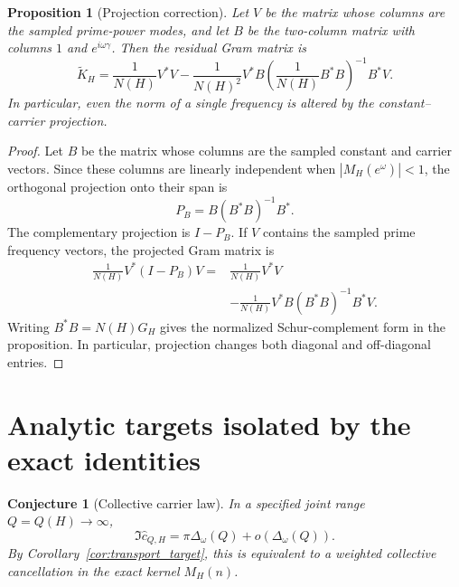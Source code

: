 \documentclass[11pt]{amsart}
\numberwithin{equation}{section}
\theoremstyle{plain}
\newtheorem{proposition}[theorem]{Proposition}
\newtheorem{conjecture}[theorem]{Conjecture}
\theoremstyle{definition}
\theoremstyle{remark}
\newcommand{\1}{\mathbf{1}}
\begin{document}
\begin{proposition}[Projection correction]
\label{prop:projection_correction_detailed}
Let $V$ be the matrix whose columns are the sampled prime-power modes, and
let $B$ be the two-column matrix with columns $1$ and $e^{i\omega\gamma}$.
Then the residual Gram matrix is
\begin{equation}
\widetilde K_H
=
\frac1{N(H)}V^\ast V
-
\frac1{N(H)^2}
V^\ast B
\left(\frac1{N(H)}B^\ast B\right)^{-1}
B^\ast V.
\label{eq:matrix_schur_projection}
\end{equation}
In particular, even the norm of a single frequency is altered by the
constant--carrier projection.
\end{proposition}

\begin{proof}
Let \(B\) be the matrix whose columns are the sampled constant and carrier
vectors.  Since these columns are linearly independent when
\(|M_H(e^\omega)|<1\), the orthogonal projection onto their span is
\begin{equation}
P_B=B(B^\ast B)^{-1}B^\ast.
\label{eq:projection_PB_detailed}
\end{equation}
The complementary projection is \(I-P_B\).  If \(V\) contains the sampled
prime frequency vectors, the projected Gram matrix is
\begin{align}
\frac1{N(H)}V^\ast(I-P_B)V
={}&
\frac1{N(H)}V^\ast V
\label{eq:projection_gram_one}
\\
&-
\frac1{N(H)}V^\ast B(B^\ast B)^{-1}B^\ast V.
\label{eq:projection_gram_two}
\end{align}
Writing \(B^\ast B=N(H)G_H\) gives the normalized Schur-complement form in
the proposition.  In particular, projection changes both diagonal and
off-diagonal entries.
\end{proof}

\section{Analytic targets isolated by the exact identities}
\label{sec:analytic_targets}

\begin{conjecture}[Collective carrier law]
\label{conj:collective_carrier_law}
In a specified joint range $Q=Q(H)\to\infty$,
\begin{equation}
\Im\widehat c_{Q,H}
=
\pi\Delta_\omega(Q)
+
o\left(\Delta_\omega(Q)\right).
\label{eq:collective_carrier_law}
\end{equation}
By Corollary~\ref{cor:transport_target}, this is equivalent to a weighted
collective cancellation in the exact kernel $M_H(n)$.
\end{conjecture}
\end{document}

